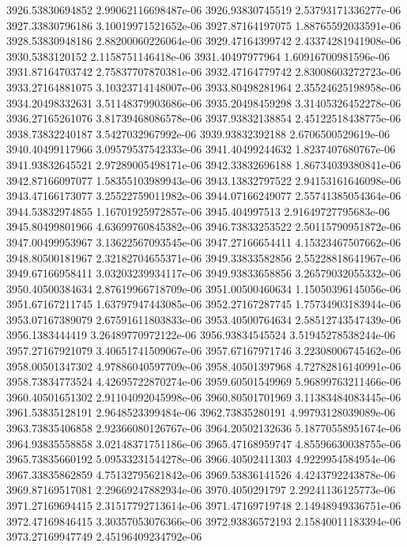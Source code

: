 {3926.53830694852 2.99062116698487e-06
3926.93830745519 2.53793171336277e-06
3927.33830796186 3.10019971521652e-06
3927.87164197075 1.88765592033591e-06
3928.53830948186 2.88200060226064e-06
3929.47164399742 2.43374281941908e-06
3930.5383120152 2.1158751146418e-06
3931.40497977964 1.60916700981596e-06
3931.87164703742 2.75837707870381e-06
3932.47164779742 2.83008603272723e-06
3933.27164881075 3.10323714148007e-06
3933.80498281964 2.35524625198958e-06
3934.20498332631 3.51148379903686e-06
3935.20498459298 3.31405326452278e-06
3936.27165261076 3.81739468086578e-06
3937.93832138854 2.45122518438775e-06
3938.73832240187 3.5427032967992e-06
3939.93832392188 2.6706500529619e-06
3940.40499117966 3.09579537542333e-06
3941.40499244632 1.8237407680767e-06
3941.93832645521 2.97289005498171e-06
3942.33832696188 1.86734039380841e-06
3942.87166097077 1.58355103989943e-06
3943.13832797522 2.94153161646098e-06
3943.47166173077 3.25522759011982e-06
3944.07166249077 2.55741385054364e-06
3944.53832974855 1.16701925972857e-06
3945.404997513 2.91649727795683e-06
3945.80499801966 4.63699760845382e-06
3946.73833253522 2.50115790951872e-06
3947.00499953967 3.13622567093545e-06
3947.27166654411 4.15323467507662e-06
3948.80500181967 2.32182704655371e-06
3949.33833582856 2.55228818641967e-06
3949.67166958411 3.03203239934117e-06
3949.93833658856 3.26579032055332e-06
3950.40500384634 2.87619966718709e-06
3951.00500460634 1.15050396145056e-06
3951.67167211745 1.63797947443085e-06
3952.27167287745 1.75734903183944e-06
3953.07167389079 2.67591611803833e-06
3953.40500764634 2.58512743547439e-06
3956.1383444419 3.26489770972122e-06
3956.93834545524 3.51945278538244e-06
3957.27167921079 3.40651741509067e-06
3957.67167971746 3.22308006745462e-06
3958.00501347302 4.97886040597709e-06
3958.40501397968 4.72782816140991e-06
3958.73834773524 4.42695722870274e-06
3959.60501549969 5.96899763211466e-06
3960.40501651302 2.91104092045998e-06
3960.80501701969 3.11383484083445e-06
3961.53835128191 2.9648523399484e-06
3962.73835280191 4.99793128039089e-06
3963.73835406858 2.92366080126767e-06
3964.20502132636 5.18770558951674e-06
3964.93835558858 3.02148371751186e-06
3965.47168959747 4.85596630038755e-06
3965.73835660192 5.09533231544278e-06
3966.40502411303 4.9229954584954e-06
3967.33835862859 4.75132795621842e-06
3969.53836141526 4.4243792243878e-06
3969.87169517081 2.29669247882934e-06
3970.4050291797 2.29241136125773e-06
3971.27169694415 2.31517792713614e-06
3971.47169719748 2.14948949336751e-06
3972.47169846415 3.30357053076366e-06
3972.93836572193 2.15840011183394e-06
3973.27169947749 2.45196409234792e-06
}
